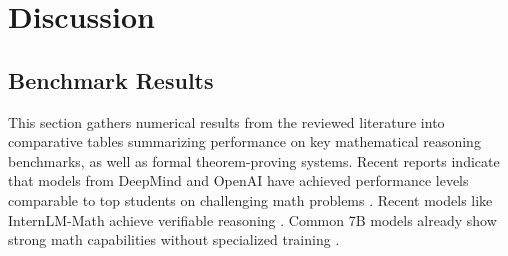\documentclass[acmsmall,anonymous]{acmart}
\begin{document}
\section{Discussion}\label{sec:benchmarks}
\subsection{Benchmark Results}

This section gathers numerical results from the reviewed literature into
comparative tables summarizing performance on key mathematical reasoning benchmarks, as well as formal theorem-proving systems. Recent reports indicate that models from DeepMind and OpenAI have achieved performance levels comparable to top students on challenging math problems \cite{gibney2025deepmindopenai,anonymous2025deepmindopenai}. Recent models like InternLM-Math achieve verifiable reasoning \cite{ying2024 b internlm}. Common 7B models already show strong math capabilities without specialized training \cite{li2024a common}.

\end{document}
